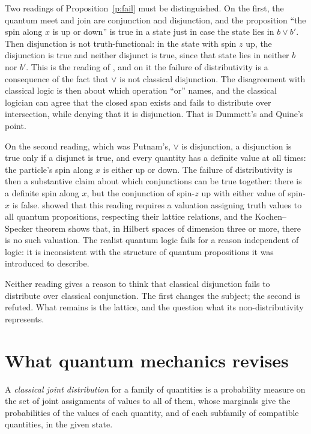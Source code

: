 \documentclass{situationist-preprint}
\begin{document}
Two readings of Proposition~\ref{p:fail} must be distinguished. On the first, the quantum meet and join are conjunction and disjunction, and the proposition \enquote{the spin along $x$ is up or down} is true in a state just in case the state lies in $b \vee b'$. Then disjunction is not truth-functional: in the state with spin $z$ up, the disjunction is true and neither disjunct is true, since that state lies in neither $b$ nor $b'$. This is the reading of \citet{BirkhoffVonNeumann1936}, and on it the failure of distributivity is a consequence of the fact that $\vee$ is not classical disjunction. The disagreement with classical logic is then about which operation \enquote{or} names, and the classical logician can agree that the closed span exists and fails to distribute over intersection, while denying that it is disjunction. That is Dummett's and Quine's point.

On the second reading, which was Putnam's, $\vee$ is disjunction, a disjunction is true only if a disjunct is true, and every quantity has a definite value at all times: the particle's spin along $x$ is either up or down. The failure of distributivity is then a substantive claim about which conjunctions can be true together: there is a definite spin along $x$, but the conjunction of spin-$z$ up with either value of spin-$x$ is false. \citet{Stairs1983} showed that this reading requires a valuation assigning truth values to all quantum propositions, respecting their lattice relations, and the Kochen--Specker theorem shows that, in Hilbert spaces of dimension three or more, there is no such valuation. The realist quantum logic fails for a reason independent of logic: it is inconsistent with the structure of quantum propositions it was introduced to describe.

Neither reading gives a reason to think that classical disjunction fails to distribute over classical conjunction. The first changes the subject; the second is refuted. What remains is the lattice, and the question what its non-distributivity represents.

\section{What quantum mechanics revises}

\begin{definition}\label{d:joint}
A \emph{classical joint distribution} for a family of quantities is a probability measure on the set of joint assignments of values to all of them, whose marginals give the probabilities of the values of each quantity, and of each subfamily of compatible quantities, in the given state.
\end{definition}
\end{document}
